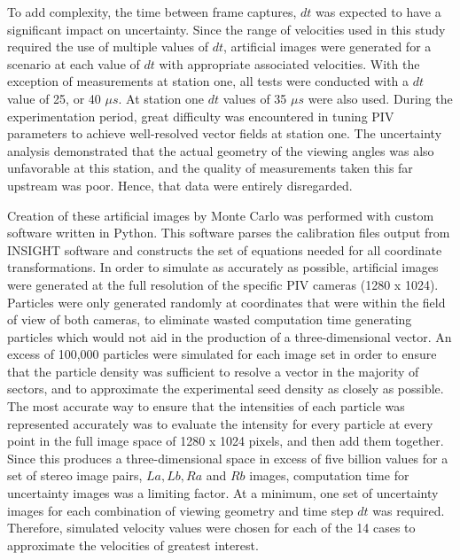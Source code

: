 To add complexity, the time between frame captures, $dt$ was expected to have a 
significant impact on uncertainty. Since the range of velocities used in this 
study required the use of multiple values of $dt$, artificial images were 
generated for a scenario at each value of $dt$ with appropriate associated 
velocities. 
With the exception of measurements at station one, all tests were conducted 
with a $dt$ value of 25, or 40 $\mu s$. At station one $dt$ values of 35 
$\mu s$ were also used. During the experimentation period, great difficulty 
was encountered in tuning PIV parameters to achieve well-resolved vector fields 
at station one. The uncertainty analysis demonstrated that the actual geometry 
of the viewing angles was also unfavorable at this station, and the quality of 
measurements taken this far upstream was poor. Hence, that data were entirely 
disregarded.

Creation of these artificial images by Monte Carlo was performed with custom 
software written in Python\texttrademark. This software parses the calibration 
files output 
from INSIGHT software and constructs the set of equations needed for all 
coordinate transformations. In order to simulate as accurately as possible, 
artificial images were generated at the full resolution of the specific PIV 
cameras (1280 x 1024). Particles were only generated randomly at coordinates 
that were within the field of view of both cameras, to eliminate wasted 
computation time generating particles which would not aid in the production of 
a three-dimensional vector. An excess of 100,000 particles were simulated for 
each image set in order to ensure that the particle density was sufficient to 
resolve a vector in the majority of sectors, and to approximate the 
experimental seed density as closely as possible. The most accurate way to 
ensure that the intensities of each particle was represented accurately was to 
evaluate the intensity for every particle at every point in the full image 
space of 1280 x 1024 pixels, and then add them together. Since this produces a 
three-dimensional space in excess 
of five billion values for a set of stereo image pairs, $La, Lb, Ra$ and $Rb$ 
images, computation time for uncertainty images was a limiting factor. At a 
minimum, one set of uncertainty images for each combination of viewing geometry 
and time step $dt$ was required. Therefore, simulated velocity values were 
chosen for each of the 14 cases to approximate the velocities of greatest 
interest. 

